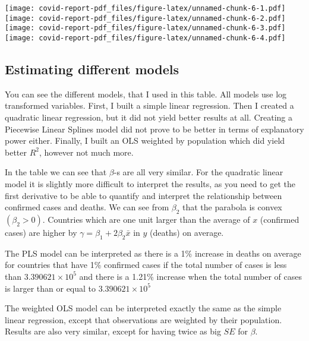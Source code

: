 \documentclass[
]{article}
\begin{document}
\texttt{[image: covid-report-pdf\_files/figure-latex/unnamed-chunk-6-1.pdf]}
\texttt{[image: covid-report-pdf\_files/figure-latex/unnamed-chunk-6-2.pdf]}
\texttt{[image: covid-report-pdf\_files/figure-latex/unnamed-chunk-6-3.pdf]}
\texttt{[image: covid-report-pdf\_files/figure-latex/unnamed-chunk-6-4.pdf]}

\newpage

\hypertarget{estimating-different-models}{%
\subsection{Estimating different
models}\label{estimating-different-models}}

You can see the different models, that I used in this table. All models
use log transformed variables. First, I built a simple linear
regression. Then I created a quadratic linear regression, but it did not
yield better results at all. Creating a Piecewise Linear Splines model
did not prove to be better in terms of explanatory power either.
Finally, I built an OLS weighted by population which did yield better
\(R^2\), however not much more.

In the table we can see that \(\beta\)-s are all very similar. For the
quadratic linear model it is slightly more difficult to interpret the
results, as you need to get the first derivative to be able to quantify
and interpret the relationship between confirmed cases and deaths. We
can see from \(\beta_2\) that the parabola is convex \((\beta_2>0)\).
Countries which are one unit larger than the average of \(x\) (confirmed
cases) are higher by \(\gamma=\beta_1+2\beta_2\bar x\) in \(y\) (deaths)
on average.

The PLS model can be interpreted as there is a 1\% increase in deaths on
average for countries that have 1\% confirmed cases if the total number
of cases is less than \ensuremath{3.390621\times 10^{5}} and there is a
1.21\% increase when the total number of cases is larger than or equal
to \ensuremath{3.390621\times 10^{5}}

The weighted OLS model can be interpreted exactly the same as the simple
linear regression, except that observations are weighted by their
population. Results are also very similar, except for having twice as
big \(SE\) for \(\beta\).
\end{document}
